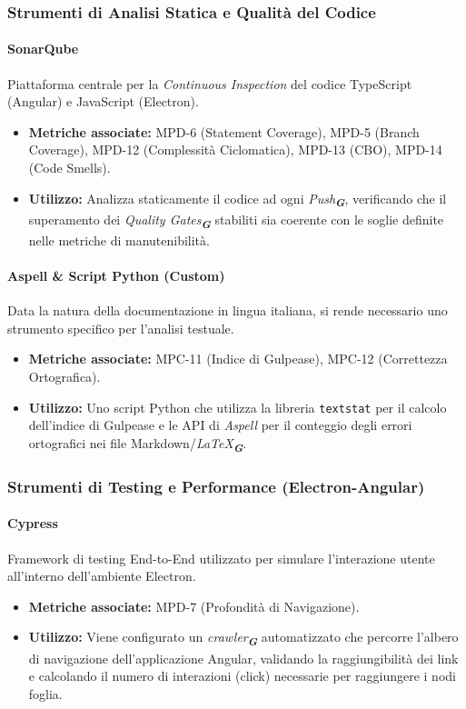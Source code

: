 \documentclass[a4paper,12pt]{article}
\newcommand{\glossario}[1]{\textit{#1}\textsubscript{\textbf{\textit{\textcolor{lightblack}{G}}}}}
\begin{document}
\subsubsection{Strumenti di Analisi Statica e Qualità del Codice}

\paragraph{SonarQube}
Piattaforma centrale per la \textit{Continuous Inspection} del codice
TypeScript (Angular) e JavaScript (Electron).
\begin{itemize}
    \item \textbf{Metriche associate:} MPD-6 (Statement Coverage), MPD-5 (Branch Coverage), MPD-12 (Complessità Ciclomatica), MPD-13 (CBO), MPD-14 (Code Smells).
    \item \textbf{Utilizzo:} Analizza staticamente il codice ad ogni \glossario{Push}, verificando che il superamento dei \glossario{Quality Gates} stabiliti sia coerente con le soglie definite nelle metriche di manutenibilità.
\end{itemize}

\paragraph{Aspell \& Script Python (Custom)}
Data la natura della documentazione in lingua italiana, si rende necessario uno
strumento specifico per l'analisi testuale.
\begin{itemize}
    \item \textbf{Metriche associate:} MPC-11 (Indice di Gulpease), MPC-12 (Correttezza Ortografica).
    \item \textbf{Utilizzo:} Uno script Python che utilizza la libreria \texttt{textstat} per il calcolo dell'indice di Gulpease e le API di \textit{Aspell} per il conteggio degli errori ortografici nei file Markdown/\glossario{LaTeX}.
\end{itemize}

\subsubsection{Strumenti di Testing e Performance (Electron-Angular)}

\paragraph{Cypress}
Framework di testing End-to-End utilizzato per simulare l'interazione utente
all'interno dell'ambiente Electron.
\begin{itemize}
    \item \textbf{Metriche associate:} MPD-7 (Profondità di Navigazione).
    \item \textbf{Utilizzo:} Viene configurato un \glossario{crawler} automatizzato che percorre l'albero di navigazione dell'applicazione Angular, validando la raggiungibilità dei link e calcolando il numero di interazioni (click) necessarie per raggiungere i nodi foglia.
\end{itemize}
\end{document}
